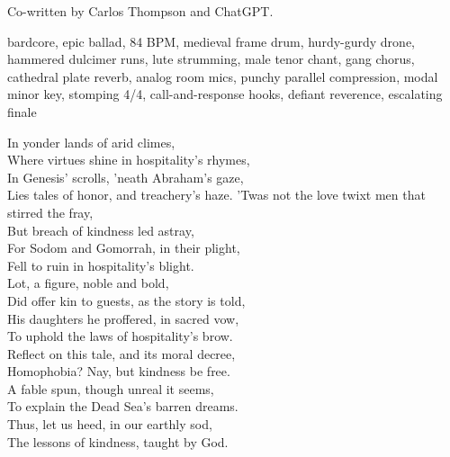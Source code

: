 
\begin{notes}
Co-written by Carlos Thompson and ChatGPT.
\end{notes}
\begin{style}
bardcore, epic ballad, 84 BPM, medieval frame drum, hurdy-gurdy drone, hammered dulcimer runs, lute strumming, male tenor chant, gang chorus, cathedral plate reverb, analog room mics, punchy parallel compression, modal minor key, stomping 4/4, call-and-response hooks, defiant reverence, escalating finale
\end{style}
\begin{lyrics}
In yonder lands of arid climes,\\
Where virtues shine in hospitality's rhymes,\\
In Genesis' scrolls, 'neath Abraham's gaze,\\
Lies tales of honor, and treachery's haze.
'Twas not the love twixt men that stirred the fray,\\
But breach of kindness led astray,\\
For Sodom and Gomorrah, in their plight,\\
Fell to ruin in hospitality's blight.\\
Lot, a figure, noble and bold,\\
Did offer kin to guests, as the story is told,\\
His daughters he proffered, in sacred vow,\\
To uphold the laws of hospitality's brow.\\
Reflect on this tale, and its moral decree,\\
Homophobia? Nay, but kindness be free.\\
A fable spun, though unreal it seems,\\
To explain the Dead Sea's barren dreams.\\
Thus, let us heed, in our earthly sod,\\
The lessons of kindness, taught by God.
\end{lyrics}

